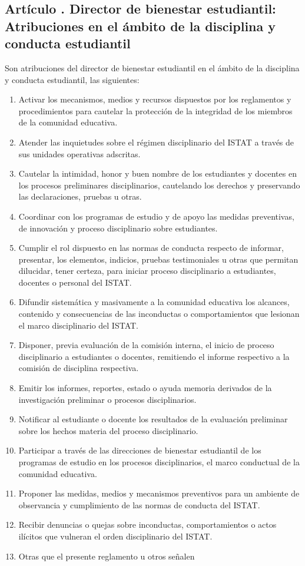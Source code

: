 \subsection{Artículo . Director de bienestar estudiantil: Atribuciones en el ámbito de la disciplina y conducta estudiantil}
\addtocounter{ns}{1}
Son atribuciones del director de bienestar estudiantil en el ámbito de la disciplina y conducta estudiantil, las siguientes: 
\begin{enumerate}
\item Activar los mecanismos, medios y recursos dispuestos por los reglamentos y procedimientos para cautelar la protección de la integridad de los miembros de la comunidad educativa. 
\item Atender las inquietudes sobre el régimen disciplinario del ISTAT a través de sus unidades operativas adscritas. 
\item Cautelar la intimidad, honor y buen nombre de los estudiantes y docentes en los procesos preliminares disciplinarios, cautelando los derechos y preservando las declaraciones, pruebas u otras. 
\item Coordinar con los programas de estudio y de apoyo las medidas preventivas, de innovación y proceso disciplinario sobre estudiantes. 
\item Cumplir el rol dispuesto en las normas de conducta respecto de informar, presentar, los elementos, indicios, pruebas testimoniales u otras que permitan dilucidar, tener certeza, para iniciar proceso disciplinario a estudiantes, docentes o personal del ISTAT. 
\item Difundir sistemática y masivamente a la comunidad educativa los alcances, contenido y consecuencias de las inconductas o comportamientos que lesionan el marco disciplinario del ISTAT. 
\item Disponer, previa evaluación de la comisión interna, el inicio de proceso disciplinario a estudiantes o docentes, remitiendo el informe respectivo a la comisión de disciplina respectiva. 
\item Emitir los informes, reportes, estado o ayuda memoria derivados de la investigación preliminar o procesos disciplinarios. 
\item Notificar al estudiante o docente los resultados de la evaluación preliminar sobre los hechos materia del proceso disciplinario. 
\item Participar a través de las direcciones de bienestar estudiantil de los programas de estudio en los procesos disciplinarios, el marco conductual de la comunidad educativa. 
\item Proponer las medidas, medios y mecanismos preventivos para un ambiente de observancia y cumplimiento de las normas de conducta del ISTAT. 
\item Recibir denuncias o quejas sobre inconductas, comportamientos o actos ilícitos que vulneran el orden disciplinario del ISTAT.   
\item Otras que el presente reglamento u otros señalen 
\end{enumerate}
